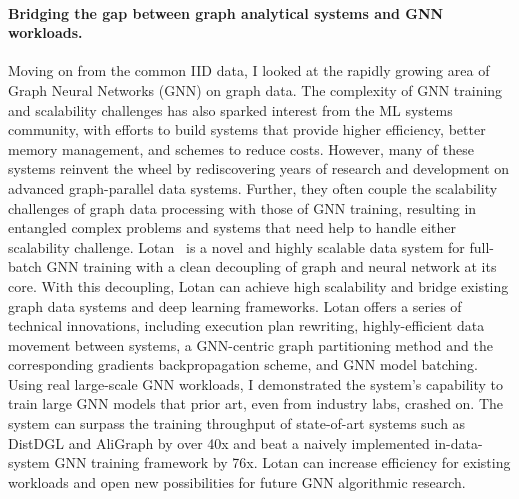 \documentclass[letterpaper]{article}
\begin{document}
\paragraph{Bridging the gap between graph analytical systems and GNN workloads.}
Moving on from the common IID data, I looked at the rapidly growing area of Graph Neural Networks (GNN) on graph data. The complexity of GNN training and scalability challenges has also sparked interest from the ML systems community, with efforts to build systems that provide higher efficiency, better memory management, and schemes to reduce costs. However, many of these systems reinvent the wheel by rediscovering years of research and development on advanced graph-parallel data systems. Further, they often couple the scalability challenges of graph data processing with those of GNN training, resulting in entangled complex problems and systems that need help to handle either scalability challenge. Lotan~\cite{lotan} is a novel and highly scalable data system for full-batch GNN training with a clean decoupling of graph and neural network at its core. With this decoupling, Lotan can achieve high scalability and bridge existing graph data systems and deep learning frameworks. Lotan offers a series of technical innovations, including execution plan rewriting, highly-efficient data movement between systems, a GNN-centric graph partitioning method and the corresponding gradients backpropagation scheme, and GNN model batching. Using real large-scale GNN workloads, I demonstrated the system's capability to train large GNN models that prior art, even from industry labs, crashed on. The system can surpass the training throughput of state-of-art systems such as DistDGL and AliGraph by over 40x and beat a naively implemented in-data-system GNN training framework by 76x. Lotan can increase efficiency for existing workloads and open new possibilities for future GNN algorithmic research.
\end{document}
